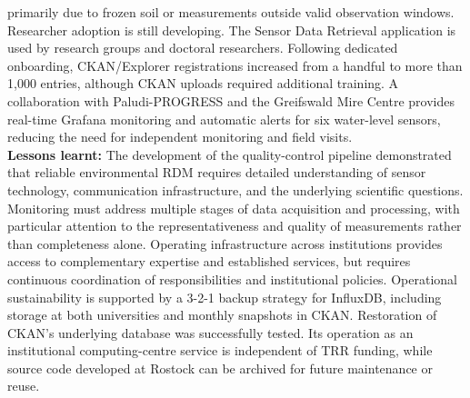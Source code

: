 \documentclass{eceasst}
\begin{document}
primarily due to frozen soil or measurements outside valid observation windows.
Researcher adoption is still developing.
The Sensor Data Retrieval application is used by
research groups and doctoral researchers.
Following dedicated onboarding, CKAN/Explorer
registrations increased from a handful to more
than 1,000 entries, although CKAN uploads required
additional training.
A collaboration with Paludi-PROGRESS and the
Greifswald Mire Centre provides real-time Grafana
monitoring and automatic alerts for six water-level
sensors, reducing the need for independent monitoring
and field visits.
\\
\noindent\textbf{Lessons learnt:}
The development of the quality-control pipeline
demonstrated that reliable environmental RDM
requires detailed understanding of sensor technology,
communication infrastructure, and the underlying
scientific questions. Monitoring must address
multiple stages of data acquisition and processing,
with particular attention to the representativeness
and quality of measurements rather than completeness
alone.
Operating infrastructure across institutions
provides access to complementary expertise and
established services, but requires continuous
coordination of responsibilities and institutional
policies.
Operational sustainability is supported by a
3-2-1 backup strategy for InfluxDB, including
storage at both universities and monthly snapshots
in CKAN. Restoration of CKAN's underlying database
was successfully tested. Its operation as an
institutional computing-centre service is independent
of TRR funding, while source code developed at
Rostock can be archived for future maintenance
or reuse.

\end{document}
